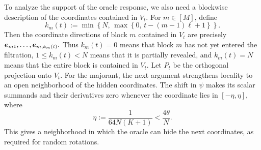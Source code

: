 To analyze the support of the oracle response, we also
need a blockwise description of the coordinates contained in
\({V}_t\).  For \(m\in[M]\), define
\[
 k_m(t)
 :=
 \min\left\{
   N,\,
   \max\left\{
     0,\,
     t-(m-1){\ell}+1
   \right\}
 \right\}.
\]
Then the coordinate directions of block \(m\) contained in
\({V}_t\) are precisely
$
 \bm{e}_{m1},\ldots,\bm{e}_{m,k_m(t)}.
$ 
Thus \(k_m(t)=0\) means that block \(m\) has not yet entered the filtration,
\(1\leq k_m(t)<N\) means that it is partially revealed, and \(k_m(t)=N\)
means that the entire block is contained in \({V}_t\).  {Let $P_t$ be the orthogonal projection onto $V_t$. For the majorant, the next argument strengthens locality to an open neighborhood of the hidden coordinates.} 
The shift in $\psi$ makes its scalar summands and their derivatives
zero whenever the coordinate lies in $[-\eta,\eta]$, where
\[
 \eta:=\frac1{64N(K+1)}<\frac{4\theta}{N}.
\]
This gives a neighborhood in which the oracle can hide the next
coordinates, as required for random rotations.
